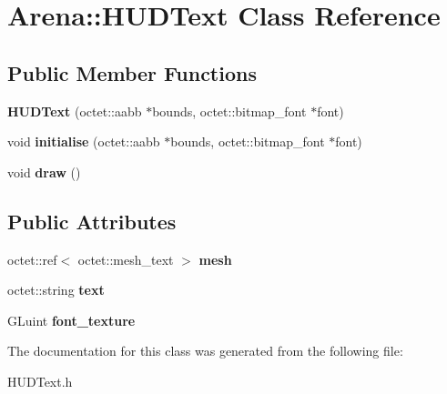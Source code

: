 \hypertarget{class_arena_1_1_h_u_d_text}{\section{Arena\+:\+:H\+U\+D\+Text Class Reference}
\label{class_arena_1_1_h_u_d_text}
}
\subsection*{Public Member Functions}
\begin{DoxyCompactItemize}
\item 
\hypertarget{class_arena_1_1_h_u_d_text_af07e3572f2f49ee49dc8b172d2b5d8ef}{{\bfseries H\+U\+D\+Text} (octet\+::aabb $\ast$bounds, octet\+::bitmap\+\_\+font $\ast$font)}\label{class_arena_1_1_h_u_d_text_af07e3572f2f49ee49dc8b172d2b5d8ef}

\item 
\hypertarget{class_arena_1_1_h_u_d_text_afdbd55005fe40c970390f36588f8b7b0}{void {\bfseries initialise} (octet\+::aabb $\ast$bounds, octet\+::bitmap\+\_\+font $\ast$font)}\label{class_arena_1_1_h_u_d_text_afdbd55005fe40c970390f36588f8b7b0}

\item 
\hypertarget{class_arena_1_1_h_u_d_text_acbada36866561ecade9e6d9bf1552a22}{void {\bfseries draw} ()}\label{class_arena_1_1_h_u_d_text_acbada36866561ecade9e6d9bf1552a22}

\end{DoxyCompactItemize}
\subsection*{Public Attributes}
\begin{DoxyCompactItemize}
\item 
\hypertarget{class_arena_1_1_h_u_d_text_a66f033de2a83ee173fbcf6460a3c13bc}{octet\+::ref$<$ octet\+::mesh\+\_\+text $>$ {\bfseries mesh}}\label{class_arena_1_1_h_u_d_text_a66f033de2a83ee173fbcf6460a3c13bc}

\item 
\hypertarget{class_arena_1_1_h_u_d_text_a6736742b67e0d786bcdf21d19a3d25fc}{octet\+::string {\bfseries text}}\label{class_arena_1_1_h_u_d_text_a6736742b67e0d786bcdf21d19a3d25fc}

\item 
\hypertarget{class_arena_1_1_h_u_d_text_a8924fcdad80b6b63b748120c1466cbf3}{G\+Luint {\bfseries font\+\_\+texture}}\label{class_arena_1_1_h_u_d_text_a8924fcdad80b6b63b748120c1466cbf3}

\end{DoxyCompactItemize}


The documentation for this class was generated from the following file\+:\begin{DoxyCompactItemize}
\item 
H\+U\+D\+Text.\+h\end{DoxyCompactItemize}
